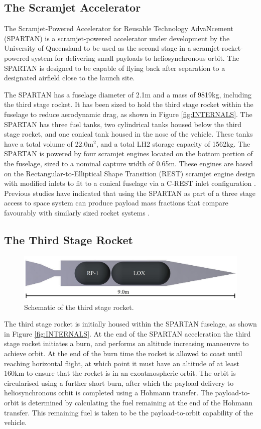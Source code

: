 \documentclass[]{aiaa-tc}
\begin{document}
\subsection{The Scramjet Accelerator}
The Scramjet-Powered Accelerator for Reusable Technology AdvaNcement (SPARTAN) is a scramjet-powered accelerator under development by the University of Queensland to be used as the second stage in a scramjet-rocket-powered system for delivering small payloads to heliosynchronous orbit\cite{Preller2017}. The SPARTAN is designed to be capable of flying back after separation to a designated airfield close to the launch site.  

The SPARTAN has a fuselage diameter of 2.1m and a mass of 9819kg, including the third stage rocket. It has been sized to hold the third stage rocket within the fuselage to reduce aerodynamic drag, as shown in Figure \ref{fig:INTERNALS}. The SPARTAN has three fuel tanks, two cylindrical tanks housed below the third stage rocket, and one conical tank housed in the nose of the vehicle. These tanks have a total volume of 22.0m$^2$, and a total LH2 storage capacity of 1562kg. 
The SPARTAN is powered by four scramjet engines located on the bottom portion of the fuselage, sized to a nominal capture width of 0.65m. These engines are based on the Rectangular-to-Elliptical Shape Transition (REST) scramjet engine design \cite{Suraweera2009} with modified inlets to fit to a conical fuselage via a C-REST inlet configuration \cite{Gollan2010}. Previous studies have indicated that using the SPARTAN as part of a three stage access to space system can produce payload mass fractions that compare favourably with similarly sized rocket systems \cite{Preller2015a,Preller2017}. 


\subsection{The Third Stage Rocket}\label{section:rocket}
\begin{figure}[ht]
	\centering
	\includegraphics[width=0.6\linewidth]{3rdStage}
	\caption{Schematic of the third stage rocket.}
	\label{fig:ThirdStage}
\end{figure}

The third stage rocket is initially housed within the SPARTAN fuselage, as shown in Figure \ref{fig:INTERNALS}. At the end of the SPARTAN acceleration the third stage rocket initiates a burn, and performs an altitude increasing manoeuvre to achieve orbit. 
At the end of the burn time the rocket is allowed to coast until reaching horizontal flight, at which point it must have an altitude of at least 160km to ensure that the rocket is in an exoatmospheric orbit. The orbit is circularised using a further short burn, after which the payload delivery to heliosynchronous orbit is completed using a Hohmann transfer. The payload-to-orbit is determined by calculating the fuel remaining at the end of the Hohmann transfer. This remaining fuel is taken to be the payload-to-orbit capability of the vehicle. 
\end{document}

